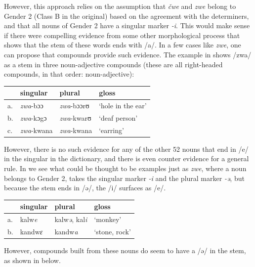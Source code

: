 However, this approach relies on the assumption that \textit{čwe} and \textit{zwe} belong to Gender 2 (Class B in the original) based on the agreement with the determiners, and that all nouns of Gender 2 have a singular marker \textit{-i}. This would make sense if there were compelling evidence from some other morphological process that shows that the stem of these words ends with /a/. In a few cases like \textit{zwe}, one can propose that compounds provide such evidence. The example in  shows /zwa/ as a stem in three noun-adjective compounds (these are all right-headed compounds, in that order: noun-adjective):

\begin{exe}
    \ex \label{stem-zwe}
    \begin{tabular}[t]{llll}
      & singular  & plural    & gloss             \\
      \midrule
      a. & \textit{zwa}-bɔɔ   & \textit{zwa}-bɔɔrʊ & `hole in the ear' \\
      b. & \textit{zwa}-kɔgɔ  & \textit{zwa}-kwarʊ & `deaf person'     \\
      c. & \textit{zwa}-kwana & \textit{zwa}-kwana & `earring'         \\
    \end{tabular}
\end{exe}

However, there is no such evidence for any of the other 52 nouns that end in /e/ in the singular in the dictionary, and there is even counter evidence for a general rule. In  we see what could be thought to be examples just as \textit{zwe}, where a noun belongs to Gender 2, takes the singular marker \textit{-i} and the plural marker \textit{-ə}, but because the stem ends in /ə/, the /i/ surfaces as /e/.

\begin{exe}
    \ex \label{stem-E-base}
    \begin{tabular}[t]{llll}
      & singular        & plural                        & gloss         \\
      \midrule
      a. & kalw\textit{e}  & kalw\textit{ə}, kal\textit{i} & `monkey'      \\
      b. & kandw\textit{ɛ} & kandw\textit{a}               & `stone, rock' \\
    \end{tabular}
\end{exe}

However, compounds built from these nouns do seem to have a /ə/ in the stem, as shown in  below.

